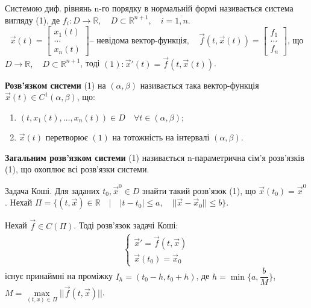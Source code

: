\documentclass[14pt,a4paper]{scrartcl}
\theoremstyle{definition}
\theoremstyle{definition}
\theoremstyle{definition}
\begin{document}
 Системою диф. рівнянь n-го порядку в нормальній формі називається система вигляду (1), де $ f_i : D \to \mathbb{R}, \quad D \subset \mathbb{R}^{n+1 }, \quad i = \overline{1, n}$.
\look
\[
      \overrightarrow{x}(t) = \left[\begin{array}{l}
      x_1(t)    \\
      \dots     \\
      x_n(t)
      \end{array}\right] \text{-- невідома вектор-функція}, \quad
      \overrightarrow{f}(t, \overrightarrow{x}(t)) = \left[\begin{array}{l}
      f_1     \\
      \dots  \\
      f_n
      \end{array}\right] \text{, що}
\]
$D \rightarrow \mathbb{R}, \quad D \subset \mathbb{R}^{n+1}$, тоді $(1): \overrightarrow{x}'(t) = \overrightarrow{f}(t, \overrightarrow{x}(t))$.


\def\rect{\textbf{П}}
\bd
\textbf{Розв'язком системи} (1) на $(\alpha , \beta)$ називається така вектор-функція $\overrightarrow{x} (t) \in C^1(\alpha , \beta)$, що:
\begin{enumerate}
  \item $(t, x_1(t), \dots, x_n(t)) \in D \quad \forall t \in (\alpha, \beta)$;
  \item $\overrightarrow{x}(t)$  перетворює $(1)$ на тотожність на інтервалі $(\alpha, \beta)$.
\end{enumerate}

\textbf{Загальним розв'язком системи}  (1) називається n-параметрична сім'я розв'язків (1), що охоплює всі розв'язки системи.
\ed

Задача Коші. Для заданих $t_0, \overrightarrow{x}^{0} \in D$ знайти такий розв'язок (1), що $\overrightarrow{x} (t_0) = \overrightarrow{x}^{0}$.
Нехай $\Pi = \{(t, \overrightarrow{x}) \in \mathbb{R} \quad \big| \quad |t-t_0| \leq a, \quad ||\overrightarrow{x} - \overrightarrow{x}_0|| \leq b \}$.

\begin{boxteo}
Нехай $\overrightarrow{f} \in C(\Pi)$. Тоді розв'язок задачі Коші:
\begin{gather*}
  \begin{cases}
    \overrightarrow{x}' = \overrightarrow{f}(t, \overrightarrow{x}) \\
    \overrightarrow{x}(t_0) = \overrightarrow{x}_0
  \end{cases}
\end{gather*}
існує принаймні на проміжку $I_h = (t_0 - h, t_0 + h)$, де $h = \min\{{a, \dfrac{b}{M}}\}$, \\ $M = \max\limits_{(t, x) \in \Pi} {||\overrightarrow{f}(t, \overrightarrow{x})||}$.
\end{boxteo}
\end{document}
